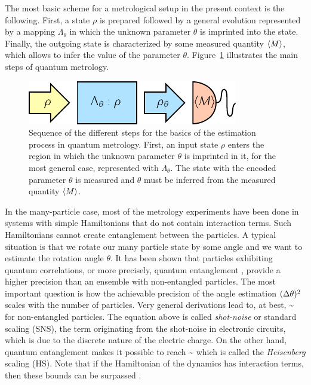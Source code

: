 The most basic scheme for a metrological setup in the present context is the following.
First, a state $\rho$ is prepared followed by a general evolution represented by a mapping $\Lambda_{\theta}$ in which the unknown parameter $\theta$ is imprinted into the state.
Finally, the outgoing state is characterized by some measured quantity $\langle M \rangle$, which allows to infer the value of the parameter $\theta$.
Figure~\ref{fig:bg-preparation-encoding-estimation} illustrates the main steps of quantum metrology.
\begin{figure}[htp]
  \centering
  \includegraphics[scale=1.2]{img/BG_preparation_encoding_estimation.pdf}
  \caption[The estimation process in quantum metrology]{Sequence of the different steps for the basics of the estimation process in quantum metrology. First, an input state $\rho$ enters the region in which the unknown parameter $\theta$ is imprinted in it, for the most general case, represented with $\Lambda_{\theta}$. The state with the encoded parameter $\theta$ is measured and $\theta$ must be inferred from the measured quantity $\langle M \rangle$.}
  \label{fig:bg-preparation-encoding-estimation}
\end{figure}

In the many-particle case, most of the metrology experiments have been done in systems with simple Hamiltonians that do not contain interaction terms.
Such Hamiltonians cannot create entanglement between the particles.
A typical situation is that we rotate our many particle state by some angle and we want to estimate the rotation angle $\theta$.
It has been shown that particles exhibiting quantum correlations, or more precisely, quantum entanglement \citep{Guehne2009, Luis2004}, provide a higher precision than an ensemble with non-entangled particles.
The most important question is how the achievable precision of the angle estimation $(\Delta \theta )^2$ scales with the number of particles.
Very general derivations lead to, at best,
\be
  \label{eq:bg-shot-noise-scaling}
  \varian{\theta}\sim {}
\ee
for non-entangled particles.
The equation above is called \emph{shot-noise} or standard scaling (SNS), the term originating from the shot-noise in electronic circuits, which is due to the discrete nature of the electric charge.
On the other hand, quantum entanglement makes it possible to reach
\be
  \label{eq:bg-heisenberg-scaling}
  \varian{\theta}\sim {}
\ee
which is called the \emph{Heisenberg} scaling (HS).
Note that if the Hamiltonian of the dynamics has interaction terms, then these bounds can be surpassed \citep{Luis2004, Napolitano2011, Boixo2007, Braun2011, Roy2008, Choi2008, Rey2007}.

